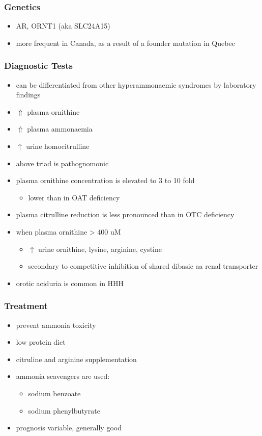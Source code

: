 \documentclass{scrartcl}
\begin{document}
\subsubsection{Genetics}
\label{sec:org7987d7e}
\begin{itemize}
\item AR, ORNT1 (aka SLC24A15)
\item more frequent in Canada, as a result of a founder mutation in Quebec
\end{itemize}

\subsubsection{Diagnostic Tests}
\label{sec:org71e7a59}
\begin{itemize}
\item can be differentiated from other hyperammonaemic syndromes by laboratory findings
\item \(\Uparrow\) plasma ornithine
\item \(\Uparrow\) plasma ammonaemia
\item \(\uparrow\) urine homocitrulline
\item above triad is pathognomonic
\item plasma ornithine concentration is elevated to 3 to 10 fold
\begin{itemize}
\item lower than in OAT deficiency
\end{itemize}
\item plasma citrulline reduction is less pronounced than in OTC
deficiency
\item when plasma ornithine \textgreater{} 400 uM
\begin{itemize}
\item \(\uparrow\) urine ornithine, lysine, arginine, cystine
\item secondary to competitive inhibition of shared dibasic aa renal
transporter
\end{itemize}
\item orotic aciduria is common in HHH
\end{itemize}

\subsubsection{Treatment}
\label{sec:org46ab706}
\begin{itemize}
\item prevent ammonia toxicity
\item low protein diet
\item citruline and arginine supplementation
\item ammonia scavengers are used:
\begin{itemize}
\item sodium benzoate
\item sodium phenylbutyrate
\end{itemize}
\item prognosis variable, generally good
\end{itemize}
\end{document}
